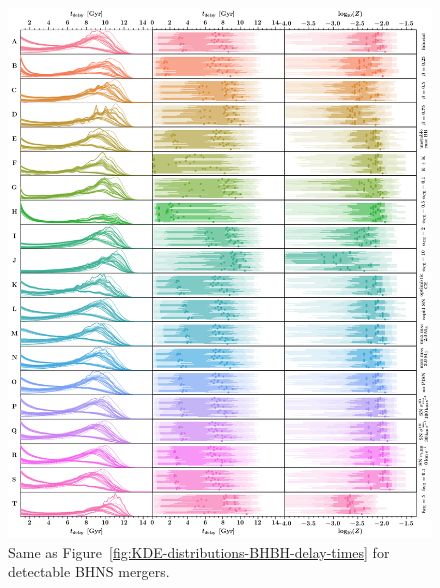 \documentclass[fleqn,usenatbib]{mnras}
\begin{document}
\begin{figure}
    \centering
\includegraphics[width=1\textwidth]{figures/KDEplot_time_metallicity_det_BHNS.png} %
\caption{Same as Figure~\ref{fig:KDE-distributions-BHBH-delay-times} for detectable \ac{BHNS} mergers. \href{https://github.com/FloorBroekgaarden/Double-Compact-Object-Mergers/blob/main/plottingCode/Fig_7_and_Fig_8_and_Fig_9/KDEplot_time_metallicity_det_BHNS.png}{\faFileImage} \href{https://github.com/FloorBroekgaarden/Double-Compact-Object-Mergers/blob/main/plottingCode/Fig_7_and_Fig_8_and_Fig_9/make_Fig_7_and_Fig_8_and_Fig_9.ipynb}{\faBook}}
    \label{fig:KDE-distributions-BHNS-delay-times}
\end{figure}
\end{document}
